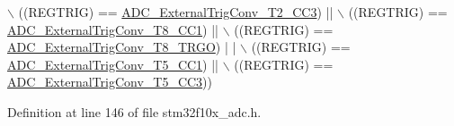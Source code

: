 \begin{DoxyCode}
      \(\backslash\)
                                  ((REGTRIG) == \hyperlink{group___a_d_c__external__trigger__sources__for__regular__channels__conversion_ga16ae1b335f2c2b4facf3d4bedc2ce27f}{ADC\_ExternalTrigConv\_T2\_CC3}) || 
      \(\backslash\)
                                  ((REGTRIG) == \hyperlink{group___a_d_c__external__trigger__sources__for__regular__channels__conversion_ga97af875d12e77a67e84f3aaf1f8033ed}{ADC\_ExternalTrigConv\_T8\_CC1}) || 
      \(\backslash\)
                                  ((REGTRIG) == \hyperlink{group___a_d_c__external__trigger__sources__for__regular__channels__conversion_gab26d94590d47ae6ec46841652741abf3}{ADC\_ExternalTrigConv\_T8\_TRGO}) |
      | \(\backslash\)
                                  ((REGTRIG) == \hyperlink{group___a_d_c__external__trigger__sources__for__regular__channels__conversion_ga6bd1ad69cb455afeabf6759b640378d3}{ADC\_ExternalTrigConv\_T5\_CC1}) || 
      \(\backslash\)
                                  ((REGTRIG) == \hyperlink{group___a_d_c__external__trigger__sources__for__regular__channels__conversion_ga95b58981aff35d6d5fa229925cd6315d}{ADC\_ExternalTrigConv\_T5\_CC3}))
\end{DoxyCode}


Definition at line 146 of file stm32f10x\+\_\+adc.\+h.

